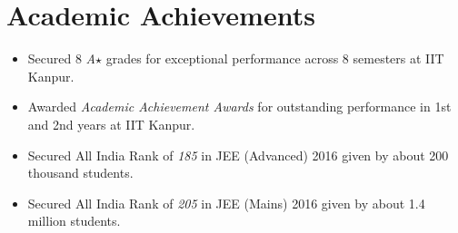 \section*{Academic Achievements}
\begin{itemize}

\setlength\itemsep{0pt}
\item Secured 8 \textit{A$\star$} grades for exceptional performance across 8 semesters at IIT Kanpur.
\item Awarded \textit{Academic Achievement Awards} for outstanding performance in 1st and 2nd years at IIT Kanpur.
\item Secured All India Rank of \textit{185} in JEE (Advanced) 2016 given by about 200 thousand students.
\item Secured All India Rank of \textit{205} in JEE (Mains) 2016 given by about 1.4 million students.

\end{itemize}
